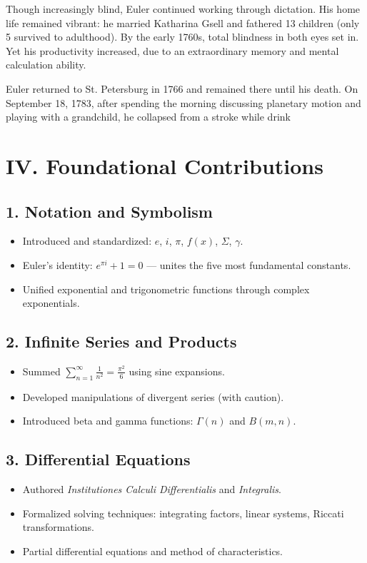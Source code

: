 \documentclass[9pt]{article}
\begin{document}
\noindent
Though increasingly blind, Euler continued working through dictation. His home life remained vibrant: he married Katharina Gsell and fathered 13 children (only 5 survived to adulthood). By the early 1760s, total blindness in both eyes set in. Yet his productivity increased, due to an extraordinary memory and mental calculation ability.

\vspace{1em}

\noindent
Euler returned to St. Petersburg in 1766 and remained there until his death. On September 18, 1783, after spending the morning discussing planetary motion and playing with a grandchild, he collapsed from a stroke while drink

\newpage

\section*{IV. Foundational Contributions}
\subsection*{1. Notation and Symbolism}
\begin{itemize}
  \item Introduced and standardized: $e$, $i$, $\pi$, $f(x)$, $\Sigma$, $\gamma$.
  \item Euler's identity: $e^{\pi i} + 1 = 0$ --- unites the five most fundamental constants.
  \item Unified exponential and trigonometric functions through complex exponentials.
\end{itemize}

\subsection*{2. Infinite Series and Products}
\begin{itemize}
  \item Summed $\sum_{n=1}^\infty \frac{1}{n^2} = \frac{\pi^2}{6}$ using sine expansions.
  \item Developed manipulations of divergent series (with caution).
  \item Introduced beta and gamma functions: $\Gamma(n)$ and $B(m,n)$.
\end{itemize}

\subsection*{3. Differential Equations}
\begin{itemize}
  \item Authored \textit{Institutiones Calculi Differentialis} and \textit{Integralis}.
  \item Formalized solving techniques: integrating factors, linear systems, Riccati transformations.
  \item Partial differential equations and method of characteristics.
\end{itemize}
\end{document}
